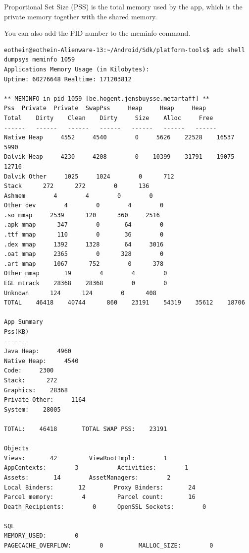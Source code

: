 Proportional Set Size (PSS) is the total memory used by the app, which is the private memory together with the shared memory.

You can also add the PID number to the meminfo command.
\begin{verbatim}
eothein@eothein-Alienware-13:~/Android/Sdk/platform-tools$ adb shell dumpsys meminfo 1059
Applications Memory Usage (in Kilobytes):
Uptime: 60276648 Realtime: 171203812

** MEMINFO in pid 1059 [be.hogent.jensbuysse.metartaff] **
Pss  Private  Private  SwapPss     Heap     Heap     Heap
Total    Dirty    Clean    Dirty     Size    Alloc     Free
------   ------   ------   ------   ------   ------   ------
Native Heap     4552     4540        0     5626    22528    16537     5990
Dalvik Heap     4230     4208        0    10399    31791    19075    12716
Dalvik Other     1025     1024        0      712                           
Stack      272      272        0      136                           
Ashmem        4        4        0        0                           
Other dev        4        0        4        0                           
.so mmap     2539      120      360     2516                           
.apk mmap      347        0       64        0                           
.ttf mmap      110        0       36        0                           
.dex mmap     1392     1328       64     3016                           
.oat mmap     2365        0      328        0                           
.art mmap     1067      752        0      378                           
Other mmap       19        4        4        0                           
EGL mtrack    28368    28368        0        0                           
Unknown      124      124        0      408                           
TOTAL    46418    40744      860    23191    54319    35612    18706

App Summary
Pss(KB)
------
Java Heap:     4960
Native Heap:     4540
Code:     2300
Stack:      272
Graphics:    28368
Private Other:     1164
System:    28005

TOTAL:    46418       TOTAL SWAP PSS:    23191

Objects
Views:       42         ViewRootImpl:        1
AppContexts:        3           Activities:        1
Assets:       14        AssetManagers:        2
Local Binders:       12        Proxy Binders:       24
Parcel memory:        4         Parcel count:       16
Death Recipients:        0      OpenSSL Sockets:        0

SQL
MEMORY_USED:        0
PAGECACHE_OVERFLOW:        0          MALLOC_SIZE:        0

\end{verbatim} 


